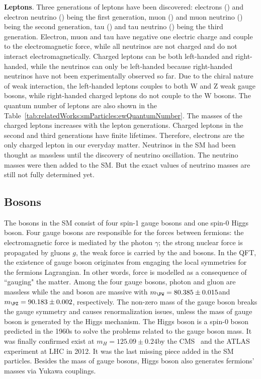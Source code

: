 \textbf{Leptons}. Three generations of leptons have been discovered: electrons (\Pe) and electron neutrino (\PGne) being the first generation, muon (\PGm) and muon neutrino (\PGnGm) being the second generation, tau (\PGt) and tau neutrino (\PGnGt) being the third generation. Electron, muon and tau have negative one electric charge and couple to the electromagnetic force, while all neutrinos are not charged and do not interact electromagnetically. Charged leptons can be both left-handed and right-handed, while the neutrinos can only be left-handed because right-handed neutrinos have not been experimentally observed so far. Due to the chiral nature of weak interaction, the left-handed leptons couples to both W and Z weak gauge bosons, while right-handed charged leptons do not couple to the W bosons. The quantum number of leptons are also shown in the Table~\ref{tab:relatedWorks:smParticles:ewQuantumNumber}. The masses of the charged leptons increases with the lepton generations. Charged leptons in the second and third generations have finite lifetimes. Therefore, electrons are the only charged lepton in our everyday matter. Neutrinos in the SM had been thought as massless until the discovery of neutrino oscillation. The neutrino masses were then added to the SM. But the exact values of neutrino masses are still not fully determined yet. 




\subsection{Bosons}
\label{sec:relatedWorks:smParticles:boson}

The bosons in the SM consist of four spin-1 gauge bosons and one spin-0 Higgs boson. Four gauge bosons are responsible for the forces between fermions: the electromagnetic force is mediated by the photon $\gamma$; the strong nuclear force is propagated by gluons $g$, the weak force is carried by the \PW and \PZ bosons. In the QFT, the existence of gauge boson originates from engaging the local symmetries for the fermions Lagrangian. In other words, force is modelled as a consequence of ``gauging" the matter. Among the four gauge bosons, photon and gluon are massless while the \PW and \PZ boson are massive with $m_\PW = 80.385\pm0.015$\GeV and $m_\PZ = 90.183\pm 0.002$\GeV \cite{pdg2020}, respectively. The non-zero mass of the gauge boson breaks the gauge symmetry and causes renormalization issues, unless the mass of gauge boson is generated by the Higgs mechanism. The Higgs boson is a spin-0 boson predicted in the 1960s to solve the problems related to the gauge boson mass. It was finally confirmed exist at $m_H=125.09\pm 0.24$\GeV by the CMS~\cite{Chatrchyan:2012ufa} and the ATLAS~\cite{Aad:2012tfa} experiment at LHC in 2012. It was the last missing piece added in the SM particles. Besides the mass of gauge bosons, Higgs boson also generates fermions' masses via Yukawa couplings.


